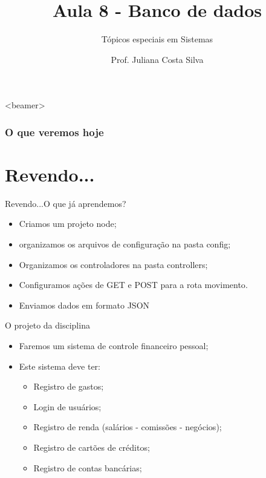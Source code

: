 \documentclass{beamer}
\title{Aula 8  - Banco de dados}
\subtitle{Tópicos especiais em Sistemas}
\author{Prof. Juliana Costa Silva}
\begin{document}
  \frame[c]{\maketitle}
      \begin{frame}<beamer>
      \frametitle{O que veremos hoje}
      \tableofcontents
    \end{frame}
    \section{Revendo...}
    \begin{frame}{Revendo...}{O que já aprendemos?}
      
      \begin{itemize}
            \item Criamos um projeto node;
            \item organizamos os arquivos de configuração na pasta config;
            \item Organizamos os controladores na pasta controllers;
            \item Configuramos ações de GET e POST para a rota \alert{movimento}.
            \item Enviamos dados em formato JSON
       \end{itemize}
       
     \end{frame}
\begin{frame}[label=proof]{O projeto da disciplina}
	\begin{itemize}
	\item Faremos um sistema de controle financeiro pessoal;
	\item Este sistema deve ter:
	\begin{itemize}
	\item Registro de gastos;
	\item Login de usuários;
	\item Registro de renda (salários - comissões - negócios);
	\item Registro de cartões de créditos;
	\item Registro de contas bancárias;
	\end{itemize}
	\end{itemize}
    \end{frame}
\end{document}

